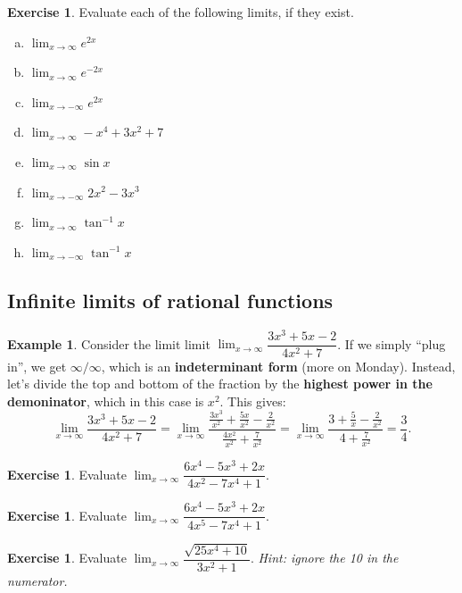 \documentclass[11pt,reqno,final]{amsart}
\numberwithin{equation}{section}
\numberwithin{figure}{section}
\theoremstyle{definition} %
\newtheorem{example}[equation]{Example}%
\newtheorem{exercise}[question]{Exercise}
\newcommand{\dlim}{\displaystyle\lim}
\begin{document}
\begin{exercise}
        Evaluate each of the following limits, if they exist.
        \begin{enumerate}[(a)]\itemsep+15pt
        \item $\dlim_{x \to \infty} e^{2x}$
        \item $\dlim_{x \to \infty} e^{-2x}$
        \item $\dlim_{x \to -\infty} e^{2x}$
        \item $\dlim_{x \to \infty} -x^4 + 3x^2 + 7$
        \item $\dlim_{x \to \infty} \sin x$
        \item $\dlim_{x \to -\infty} 2x^2- 3x^3$
        \item $\dlim_{x \to \infty} \tan^{-1}x$
        \item $\dlim_{x \to -\infty} \tan^{-1}x$
        \end{enumerate}
\end{exercise}

\subsection*{Infinite limits of rational functions}

\begin{example}
        Consider the limit limit $\dlim_{x \to \infty} \dfrac{3x^3+5x-2}{4x^2+7}$.
        If we simply ``plug in'', we get $\infty/\infty$, which is an \textbf{indeterminant form} (more on Monday).
        Instead, let's divide the top and bottom of the fraction by the \textbf{highest power in the demoninator}, which in this case is $x^2$. This gives:
        \[
                \dlim_{x \to \infty} \dfrac{3x^3+5x-2}{4x^2+7} =
                \dlim_{x \to \infty} \dfrac{\frac{3x^3}{x^2}+\frac{5x}{x^2}-\frac{2}{x^2}}{\frac{4x^2}{x^2}+\frac{7}{x^2}} =
                \dlim_{x \to \infty} \dfrac{3+ \frac{5}{x} - \frac{2}{x^2}}{4 + \frac{7}{x^2}} =
                \dfrac{3}{4}.
        \]        
\end{example}

\begin{exercise}
        Evaluate $\dlim_{x \to \infty} \dfrac{6x^4-5x^3+2x}{4x^2-7x^4+1}$.
        \vfill
\end{exercise}

\begin{exercise}
        Evaluate $\dlim_{x \to \infty} \dfrac{6x^4-5x^3+2x}{4x^5-7x^4+1}$.
        \vfill
\end{exercise}

\begin{exercise}
        Evaluate $\dlim_{x \to \infty} \dfrac{\sqrt{25x^4+10}}{3x^2+1}$.
        \textit{Hint: ignore the 10 in the numerator.}
        \vfill
\end{exercise}
\end{document}
